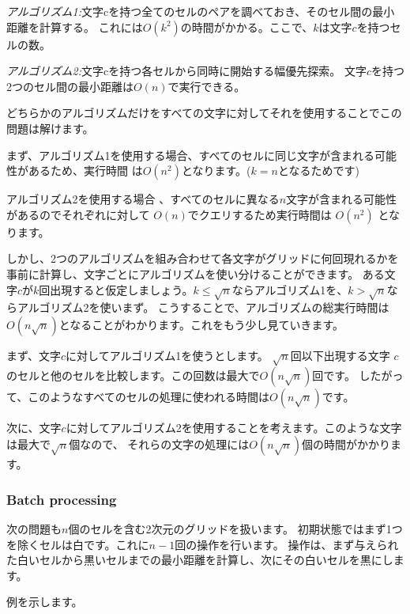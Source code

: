 \emph{アルゴリズム1:}文字cを持つ全てのセルのペアを調べておき、そのセル間の最小距離を計算する。
これには$O(k^2)$の時間がかかる。ここで、$k$は文字$c$を持つセルの数。

\emph{アルゴリズム2:}文字cを持つ各セルから同時に開始する幅優先探索。
文字$c$を持つ2つのセル間の最小距離は$O(n)$で実行できる。

どちらかのアルゴリズムだけをすべての文字に対してそれを使用することでこの問題は解けます。

まず、アルゴリズム1を使用する場合、すべてのセルに同じ文字が含まれる可能性があるため、実行時間
は$O(n^2)$となります。($k=n$となるためです)

アルゴリズム2を使用する場合 、すべてのセルに異なる$n$文字が含まれる可能性があるのでそれぞれに対して
$O(n)$でクエリするため実行時間は $O(n^2)$ となります。

しかし、2つのアルゴリズムを組み合わせて各文字がグリッドに何回現れるかを事前に計算し、文字ごとにアルゴリズムを使い分けることができます。
ある文字$c$が$k$回出現すると仮定しましょう。$k \le \sqrt n$ならアルゴリズム1を、$k > \sqrt n$ならアルゴリズム2を使いまず。
こうすることで、アルゴリズムの総実行時間は$O(n \sqrt n)$となることがわかります。これをもう少し見ていきます。

まず、文字$c$に対してアルゴリズム1を使うとします。
$\sqrt n$回以下出現する文字 $c$のセルと他のセルを比較します。この回数は最大で$O(n \sqrt n)$回です。
したがって、このようなすべてのセルの処理に使われる時間は$O(n \sqrt n)$です。

次に、文字$c$に対してアルゴリズム2を使用することを考えます。このような文字は最大で$\sqrt n$個なので、
それらの文字の処理には$O(n \sqrt n)$個の時間がかかります。

\subsubsection{Batch processing}


次の問題も$n$個のセルを含む2次元のグリッドを扱います。
初期状態ではまず1つを除くセルは白です。これに$n - 1$回の操作を行います。
操作は、まず与えられた白いセルから黒いセルまでの最小距離を計算し、次にその白いセルを黒にします。

例を示します。

\begin{center}
\end{center}

